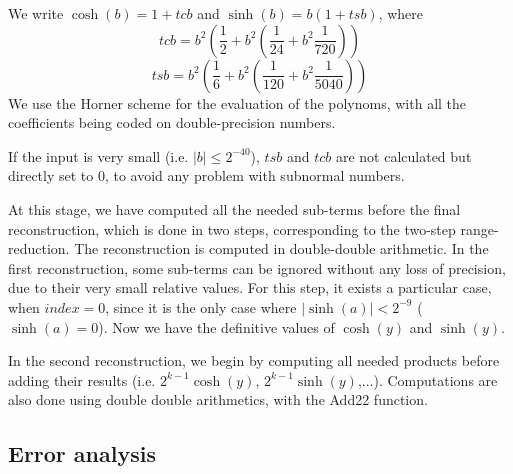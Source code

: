 We write $\cosh(b) = 1 + tcb$ and $\sinh(b) = b(1 + tsb)$, where
$$tcb = b^{2}  (\frac{1}{2} + b^{2}(\frac{1}{24} + b^{2} 
\frac{1}{720}))$$
$$tsb = b^{2} (\frac{1}{6} + b^{2} 
(\frac{1}{120} + b^{2}  \frac{1}{5040}))$$
We use the Horner
scheme  for the evaluation of the polynoms, with all the
coefficients being coded on double-precision numbers.

If the input is very small (i.e. $|b| \leq 2^{-40}$), $tsb$ and $tcb$
are not calculated but directly set to $0$, to avoid any problem with
subnormal numbers.


At this stage, we have computed all the needed sub-terms before the
final reconstruction, which is done in two steps, corresponding to the
two-step range-reduction. The reconstruction is computed in
double-double arithmetic.  In the first reconstruction, some sub-terms
can be ignored without any loss of precision, due to their very small
relative values.  For this step, it exists a particular case, when
$index = 0$, since it is the only case where $|\sinh(a)| < 2^{-9}$
($\sinh(a) = 0$).  Now we have the definitive values of $\cosh(y)$ and
$\sinh(y)$.

In the second reconstruction, we begin by computing all needed
products before adding their results (i.e. $2^{k-1}\cosh(y)$,
$2^{k-1}\sinh(y)$,...).  Computations are also done using double
double arithmetics, with the Add22 function.



\subsection{Error analysis}

